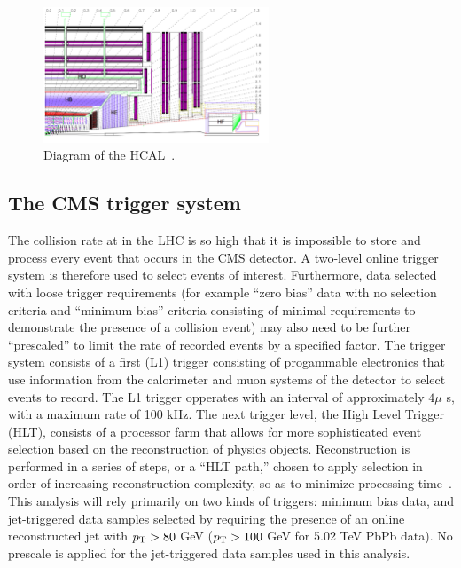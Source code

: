 \begin{figure}[h!]
\begin{center}
\includegraphics[width=0.6\textwidth]{figures/Detector/HCAL_Diagram.png}
\caption[Diagram of the HCAL]{Diagram of the HCAL~\cite{Chatrchyan:2008zzk}.}
\label{fig:HCAL}
\end{center}
\end{figure}

\subsection{The CMS trigger system}
\label{sec:HLT}

The collision rate at in the LHC is so high that it is impossible to store and process every event that occurs in the CMS detector.  A two-level online trigger system is therefore used to select events of interest.  Furthermore, data selected with loose trigger requirements (for example ``zero bias'' data with no selection criteria and ``minimum bias'' criteria consisting of minimal requirements to demonstrate the presence of a collision event) may also need to be further ``prescaled'' to limit the rate of recorded events by a specified factor.  The trigger system consists of a first (L1) trigger consisting of progammable electronics that use information from the calorimeter and muon systems of the detector to select events to record.  The L1 trigger opperates with an interval of approximately $4 \mu$ s, with a maximum rate of 100 kHz.  The next trigger level, the High Level Trigger (HLT), consists of a processor farm that allows for more sophisticated event selection based on the reconstruction of physics objects.  Reconstruction is performed in a series of steps, or a ``HLT path,'' chosen to apply selection in order of increasing reconstruction complexity, so as to minimize processing time~\cite{Khachatryan:2016bia}.  This analysis will rely primarily on two kinds of triggers:  minimum bias data, and jet-triggered data samples selected by requiring the presence of an online reconstructed jet with $p_{\rm T} > 80 $ GeV ($p_{\rm T} > 100 $ GeV for 5.02 TeV PbPb data).  No prescale is applied for the jet-triggered data samples used in this analysis.  






